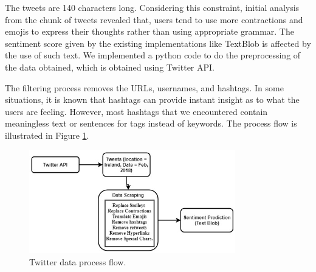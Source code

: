\documentclass[a4paper,10pt]{article}
\begin{document}
    The tweets are 140 characters long. Considering this constraint, initial analysis from the chunk of tweets revealed that, users tend to use more contractions and emojis to express their thoughts rather than using appropriate grammar. The sentiment score given by the existing implementations like TextBlob is affected by the use of such text. We implemented a python code to do the preprocessing of the data obtained, which is obtained using Twitter API.

    The filtering process removes the URLs, usernames, and hashtags. In some situations, it is known that hashtags can provide instant insight as to what the users are feeling. However, most hashtags that we encountered contain meaningless text or sentences for tags instead of keywords. The process flow is illustrated in Figure \ref{fig:twitter_process_flow}.

    \begin{figure}
        \includegraphics[width=0.8\textwidth]{twitter_process_flow.jpeg}
        \caption{Twitter data process flow.}
        \label{fig:twitter_process_flow}
    \end{figure}
\end{document}
